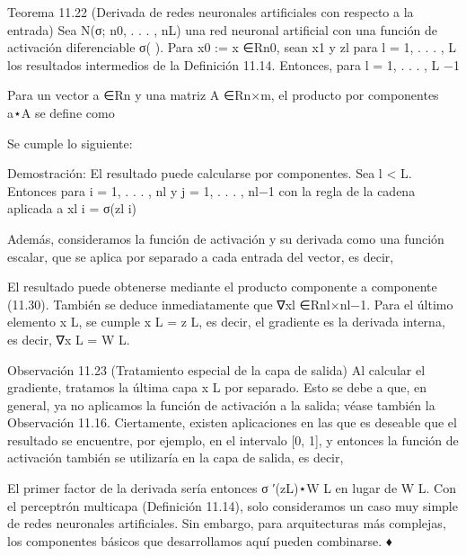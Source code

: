 \begin{frame}
  Teorema 11.22 (Derivada de redes neuronales artificiales con respecto a la entrada) Sea N(σ;
  n0, . . . , nL) una red neuronal artificial con una función de activación diferenciable
  σ( ). Para x0 := x ∈Rn0, sean x1 y zl para l = 1, . . . , L los resultados intermedios de la
  Definición 11.14. Entonces, para l = 1, . . . , L −1

  Para un vector a ∈Rn y una matriz A ∈Rn×m, el producto por componentes a⋆A se define como

  Se cumple lo siguiente:

  Demostración: El resultado puede calcularse por componentes. Sea l < L. Entonces
  para i = 1, . . . , nl y j = 1, . . . , nl−1 con la regla de la cadena aplicada a xl
  i = σ(zl
  i)

  Además, consideramos la función de activación y su derivada como una función escalar,
  que se aplica por separado a cada entrada del vector, es decir,

  El resultado puede obtenerse mediante el producto componente a componente (11.30).
  También se deduce inmediatamente que ∇xl ∈Rnl×nl−1. Para el último elemento x L, se cumple x L = z L,
  es decir, el gradiente es la derivada interna, es decir, ∇x L = W L.

  Observación 11.23 (Tratamiento especial de la capa de salida) Al calcular el gradiente, tratamos la última capa x L por separado. Esto se debe a que,
  en general, ya no aplicamos la función de activación a la salida; véase también la Observación 11.16. Ciertamente, existen aplicaciones en las que es deseable que el resultado se encuentre, por ejemplo, en el intervalo [0, 1], y entonces la función de activación también se utilizaría en la capa de salida, es decir,

  El primer factor de la derivada sería entonces σ ′(zL)⋆W L en lugar de W L.
  Con el perceptrón multicapa (Definición 11.14), solo consideramos un caso muy simple de redes neuronales artificiales. Sin embargo, para arquitecturas más complejas, los componentes básicos que desarrollamos aquí pueden combinarse.
  ♦
\end{frame}

